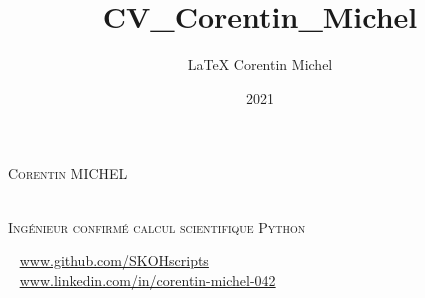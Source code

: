 \documentclass{modernsimplecv}
\title{CV_Corentin_Michel}
\author{\LaTeX{} Corentin Michel}
\date{2021}
\begin{document}
\thispagestyle{empty}




\begin{minipage}[t]{0.21\textwidth}
	\vspace{-40pt} %
\end{minipage}
\hfill
\begin{minipage}[t]{0.77\textwidth}
	\vspace{-25pt} %

	\begin{tcolorbox}[boxsep=1mm, boxrule=0.1mm, colframe=green,colback=green]
			\color{white_grey}
		\begin{minipage}[t]{0.4\textwidth}
			\vspace{0pt} %
			{\par\centering\huge\textsc{Corentin MICHEL}} \\[0.3cm]
            {\textsc{Ingénieur confirmé calcul scientifique Python}}


		\end{minipage}\hfill
		\vspace{0pt}
		\begin{minipage}[t]{0.55\textwidth}
			\vspace{0pt} %

			\faGithub ~ \protect\url{www.github.com/SKOHscripts} \\
			\faLinkedin ~ \protect\url{www.linkedin.com/in/corentin-michel-042}


\end{minipage}
\end{tcolorbox}
\end{minipage}
\end{document}
